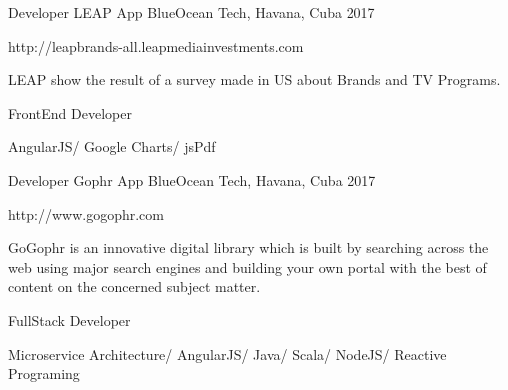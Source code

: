 \begin{cventries}

\cventry
{Developer} %
{LEAP App} %
{BlueOcean Tech, Havana, Cuba} %
{2017} %
{ %
\begin{cvitems}
\item {http://leapbrands-all.leapmediainvestments.com}
\item {LEAP show the result of a survey made in US about Brands and TV Programs.}
\item {FrontEnd Developer}
\item {AngularJS/ Google Charts/ jsPdf}
\end{cvitems}
}


\cventry
{Developer} %
{Gophr App} %
{BlueOcean Tech, Havana, Cuba} %
{2017} %
{ %
\begin{cvitems}
\item {http://www.gogophr.com}
\item {GoGophr is an innovative digital library which is built by searching across the web using major search engines and building your own portal with the best of content on the concerned subject matter.}
\item {FullStack Developer}
\item {Microservice Architecture/ AngularJS/ Java/ Scala/ NodeJS/ Reactive Programing}
\end{cvitems}
}

\end{cventries}

